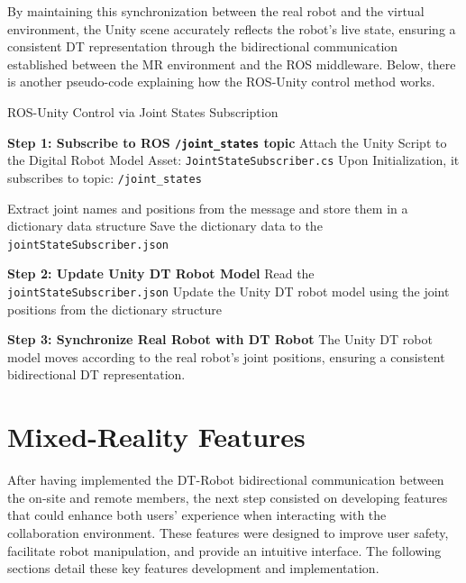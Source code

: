 By maintaining this synchronization between the real robot and the virtual environment, the Unity scene accurately reflects the robot's live state, ensuring a consistent \ac{DT} representation through the bidirectional communication established between the \ac{MR} environment and the \ac{ROS} middleware. Below, there is another pseudo-code explaining how the \ac{ROS}-Unity control method works.


\begin{algorithm}
    \caption{ROS-Unity Control via Joint States Subscription}\label{alg:ros_unity_control}
    \begin{algorithmic}[1]
        \State \textbf{Step 1: Subscribe to ROS \texttt{/joint\_states} topic}
        \State Attach the Unity Script to the Digital Robot Model Asset: \texttt{JointStateSubscriber.cs}
        \State Upon Initialization, it subscribes to topic: \texttt{/joint\_states}

            \State Extract joint names and positions from the message and store them in a dictionary data structure
            \State Save the dictionary data to the \texttt{jointStateSubscriber.json}
        \EndWhile

        \State \textbf{Step 2: Update Unity \ac{DT} Robot Model}
            \State Read the \texttt{jointStateSubscriber.json}
            \State Update the Unity \ac{DT} robot model using the joint positions from the dictionary structure
        \EndWhile

        \State \textbf{Step 3: Synchronize Real Robot with \ac{DT} Robot}
        \State The Unity \ac{DT} robot model moves according to the real robot’s joint positions, ensuring a consistent bidirectional \ac{DT} representation.
    \end{algorithmic}
\end{algorithm}



\section{Mixed-Reality Features}
\label{section:on-site-features}
After having implemented the \ac{DT}-Robot bidirectional communication between the on-site and remote members, the next step consisted on developing features that could enhance both users' experience when interacting with the collaboration environment. These features were designed to improve user safety, facilitate robot manipulation, and provide an intuitive interface. The following sections detail these key features development and implementation.

